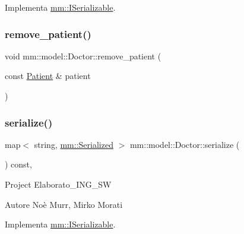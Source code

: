 Implementa \hyperlink{classmm_1_1_i_serializable_a9717e6da47fcbac3ffa2e68152464e0a}{mm\+::\+I\+Serializable}.

\mbox{\label{classmm_1_1model_1_1_doctor_a1fe35e39d290992a5f6f4a73d4fa8d50}} 
\subsubsection{\texorpdfstring{remove\+\_\+patient()}{remove\_patient()}}
{\footnotesize\ttfamily void mm\+::model\+::\+Doctor\+::remove\+\_\+patient (\begin{DoxyParamCaption}\item[{const \hyperlink{classmm_1_1model_1_1_patient}{Patient} \&}]{patient }\end{DoxyParamCaption})}

\mbox{\label{classmm_1_1model_1_1_doctor_a2171a9cb9c8a24ad0c0331edae957910}} 
\subsubsection{\texorpdfstring{serialize()}{serialize()}}
{\footnotesize\ttfamily map$<$ string, \hyperlink{structmm_1_1_serialized}{mm\+::\+Serialized} $>$ mm\+::model\+::\+Doctor\+::serialize (\begin{DoxyParamCaption}{ }\end{DoxyParamCaption}) const\hspace{0.3cm}{\ttfamily [override]}, {\ttfamily [virtual]}}

Project Elaborato\+\_\+\+I\+N\+G\+\_\+\+SW \begin{DoxyAuthor}{Autore}
Noè Murr, Mirko Morati 
\end{DoxyAuthor}


Implementa \hyperlink{classmm_1_1_i_serializable_a20a59e2324c8dbf6fefe4d11ae89d0fb}{mm\+::\+I\+Serializable}.

\mbox{\label{classmm_1_1model_1_1_doctor_a20bedf6695024e1930d033995a2ec5bf}} 
